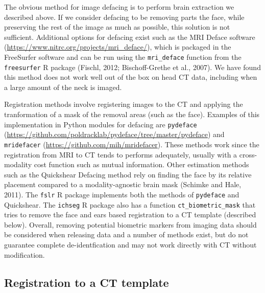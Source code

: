 \documentclass[utf8]{frontiersSCNS}
\begin{document}
The obvious method for image defacing is to perform brain extraction we described above. If we consider defacing to be removing parts the face, while preserving the rest of the image as much as possible, this solution is not sufficient. Additional options for defacing exist such as the MRI Deface software (\url{https://www.nitrc.org/projects/mri_deface/}), which is packaged in the FreeSurfer software and can be run using the \texttt{mri\_deface} function from the \texttt{freesurfer} R package (Fischl, 2012; Bischoff-Grethe et al., 2007). We have found this method does not work well out of the box on head CT data, including when a large amount of the neck is imaged.

Registration methods involve registering images to the CT and applying the tranformation of a mask of the removal areas (such as the face). Examples of this implementation in Python modules for defacing are \texttt{pydeface} (\url{https://github.com/poldracklab/pydeface/tree/master/pydeface}) and \texttt{mridefacer} (\url{https://github.com/mih/mridefacer}). These methods work since the registration from MRI to CT tends to performs adequately, usually with a cross-modality cost function such as mutual information. Other estimation methods such as the Quickshear Defacing method rely on finding the face by its relative placement compared to a modality-agnostic brain mask (Schimke and Hale, 2011). The \texttt{fslr} R package implements both the methods of \texttt{pydeface} and Quickshear. The \texttt{ichseg} R package also has a function \texttt{ct\_biometric\_mask} that tries to remove the face and ears based registration to a CT template (described below). Overall, removing potential biometric markers from imaging data should be considered when releasing data and a number of methods exist, but do not guarantee complete de-identfication and may not work directly with CT without modification.

\hypertarget{registration-to-a-ct-template}{%
\subsection{Registration to a CT template}\label{registration-to-a-ct-template}}
\end{document}
